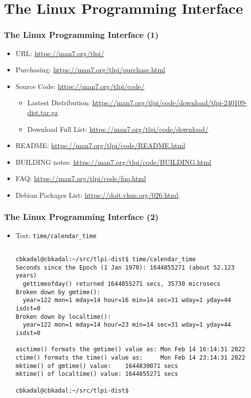 \documentclass[aspectratio=169, xcolor=table, notheorems, hyperref={pdfpagelabels=false}]{beamer}
\begin{document}
\section{The Linux Programming Interface}
\begin{frame}[fragile]
\frametitle{The Linux Programming Interface (1)}
\begin{itemize}
\item URL: \url{https://man7.org/tlpi/}
\item Purchasing: \url{https://man7.org/tlpi/purchase.html}
\item Source Code: \url{https://man7.org/tlpi/code/}
\begin{itemize}
\item Lastest Distribution: \url{https://man7.org/tlpi/code/download/tlpi-240109-dist.tar.gz}
\item Download Full List: \url{https://man7.org/tlpi/code/download/}
\end{itemize}
\item README: \url{https://man7.org/tlpi/code/README.html}
\item BUILDING notes: \url{https://man7.org/tlpi/code/BUILDING.html}
\item FAQ: \url{https://man7.org/tlpi/code/faq.html}
\item Debian Packages List: \url{https://doit.vlsm.org/026.html}.
\end{itemize}
\end{frame}

\begin{frame}[fragile]
\frametitle{The Linux Programming Interface (2)}
\begin{itemize}
\item Test: \texttt{time/calendar\_time}

\begin{lstlisting}[basicstyle=\ttfamily\small]

cbkadal@cbkadal:~/src/tlpi-dist$ time/calendar_time 
Seconds since the Epoch (1 Jan 1970): 1644855271 (about 52.123 years)
  gettimeofday() returned 1644855271 secs, 35730 microsecs
Broken down by gmtime():
  year=122 mon=1 mday=14 hour=16 min=14 sec=31 wday=1 yday=44 isdst=0
Broken down by localtime():
  year=122 mon=1 mday=14 hour=23 min=14 sec=31 wday=1 yday=44 isdst=0

asctime() formats the gmtime() value as: Mon Feb 14 16:14:31 2022
ctime() formats the time() value as:     Mon Feb 14 23:14:31 2022
mktime() of gmtime() value:    1644830071 secs
mktime() of localtime() value: 1644855271 secs

cbkadal@cbkadal:~/src/tlpi-dist$

\end{lstlisting}
\end{itemize}
\end{frame}
\end{document}
